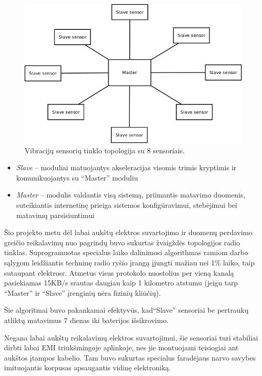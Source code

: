 \documentclass[12pt, a4paper, lithuanian, final]{article}
\begin{document}
\begin{figure}[H]
\begin{center}
\includegraphics[width=1\textwidth]{img/NorgeRail_star.png}
\caption{Vibracijų sensorių tinklo topologija su 8 sensoriais.}
\end{center}
\end{figure}

\begin{itemize}
	\item \textit{Slave} -- moduliai matuojantys akseleracijas visomis trimis kryptimis ir komunikuojantys su "`Master"' moduliu
	\item \textit{Master} -- modulis valdantis visą sistemą, priimantis matavimo duomenis, suteikiantis internetinę prieiga sistemos konfigūravimui, stebėjimui bei matavimų parsisiuntimui
\end{itemize}

Šio projekto metu dėl labai aukštų elektros suvartojimo ir duomenų perdavimo greičio reikalavimų nuo pagrindų buvo sukurtas žvaigždės topologijos radio tinklas.
Suprogramuotas specialus laiko dalinimosi algorithmas ramiom darbo sąlygom leidžiantis techninę radio ryšio įrangą įjungti mažiau nei 1\% laiko, taip sutaupant elektrosr. Atmetus visus protokolo nuostolius per vieną kanalą pasiekiamas 15KB/s srautas daugiau kaip 1 kilometro atstumu (jeigu tarp "`Master"' ir "`Slave"' įrenginių nėra fizinių kliūčių).

Šie algoritmai buvo pakankamai efektyvūs, kad"`Slave"' sensoriai be pertraukų atliktų matavimus 7 dienas iki baterijos išsikrovimo.


Negana labai aukštų reikalavimų elektros suvartojimui, šie sensoriai turi stabiliai dirbti labai EMI triukšmingoje aplinkoje, nes jie montuojami teisiogiai ant aukštos įtampos kabelio.
Tam buvo sukurtas specialus faradėjaus narvo savybes imituojantis korpusas apsaugantis vidinę elektroniką.
\end{document}
